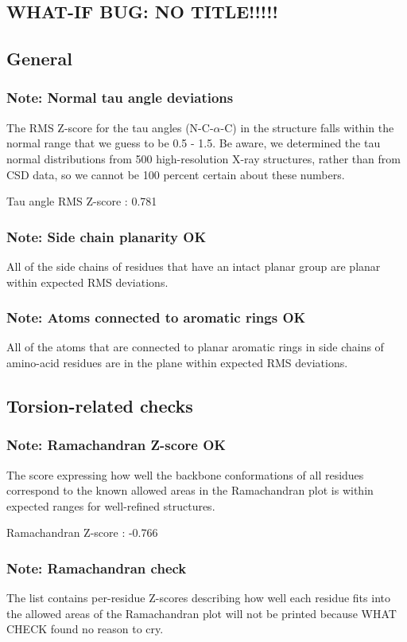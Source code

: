 \documentclass[a4paper]{article}
\def\showsect#1{
  \thesect\gdef\thesect{}
  \thessect\gdef\thessect{}
  \subsubsection{#1}
}
\def\ssect#1{
  \gdef\thessect{\subsection{#1}}
}
\gdef\thesect{\pagebreak[2]\section{WHAT-IF BUG: NO TITLE!!!!!}}
\gdef\thessect{\subsection{General}}
\begin{document}
\begin{note}
\showsect{Note: Normal tau angle deviations}
The RMS Z-score for the tau angles (N-C-$\alpha$-C) in the structure falls
within the normal range that we guess to be 0.5 - 1.5. Be aware, we
determined the tau normal distributions from 500 high-resolution X-ray
structures, rather than from CSD data, so we cannot be 100 percent certain
about these numbers.
 
\parbox{1\textwidth}{
 Tau angle RMS Z-score : 0.781
}%
 
\end{note}

\begin{note}
\showsect{Note: Side chain planarity OK}
All of the side chains of residues that have an intact planar group are
planar within expected RMS deviations.
\end{note}

\begin{note}
\showsect{Note: Atoms connected to aromatic rings OK}
All of the atoms that are connected to planar aromatic rings in side chains
of amino-acid residues are in the plane within expected RMS deviations.
\end{note}

\ssect{Torsion-related checks}
\begin{note}
\showsect{Note: Ramachandran Z-score OK}
The score expressing how well the backbone conformations of all residues
correspond to the known allowed areas in the Ramachandran plot is within
expected ranges for well-refined structures.
 
\parbox{1\textwidth}{
 Ramachandran Z-score : -0.766
}%
 
\end{note}

\begin{note}
\showsect{Note: Ramachandran check}
The list contains per-residue Z-scores describing how well each residue
fits into the allowed areas of the Ramachandran plot will not be printed
because WHAT CHECK found no reason to cry.
\end{note}
\end{document}

